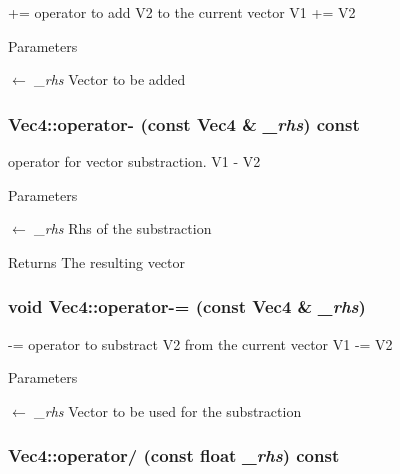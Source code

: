 += operator to add V2 to the current vector V1 += V2 
\begin{DoxyParams}{Parameters}
\item[\mbox{$\leftarrow$} {\em \_\-rhs}]Vector to be added \end{DoxyParams}
\hypertarget{classVec4_ae2579c5b5ce533033325ebd78bf3d544}{
\subsubsection[{operator-\/}]{ Vec4::operator-\/ (const {\bf Vec4} \& {\em \_\-rhs}) const}}
\label{classVec4_ae2579c5b5ce533033325ebd78bf3d544}



\begin{DoxyItemize}
\item operator for vector substraction. V1 -\/ V2 
\end{DoxyItemize}
\begin{DoxyParams}{Parameters}
\item[\mbox{$\leftarrow$} {\em \_\-rhs}]Rhs of the substraction \end{DoxyParams}
\begin{DoxyReturn}{Returns}
The resulting vector 
\end{DoxyReturn}
\hypertarget{classVec4_a92e2e5400ea9c6697360462276175034}{
\subsubsection[{operator-\/=}]{\setlength{\rightskip}{0pt plus 5cm}void Vec4::operator-\/= (const {\bf Vec4} \& {\em \_\-rhs})}}
\label{classVec4_a92e2e5400ea9c6697360462276175034}


-\/= operator to substract V2 from the current vector V1 -\/= V2 
\begin{DoxyParams}{Parameters}
\item[\mbox{$\leftarrow$} {\em \_\-rhs}]Vector to be used for the substraction \end{DoxyParams}
\hypertarget{classVec4_a294635742b4d62d2a6062f9cb6bb3a4a}{
\subsubsection[{operator/}]{ Vec4::operator/ (const float {\em \_\-rhs}) const}}
\label{classVec4_a294635742b4d62d2a6062f9cb6bb3a4a}


